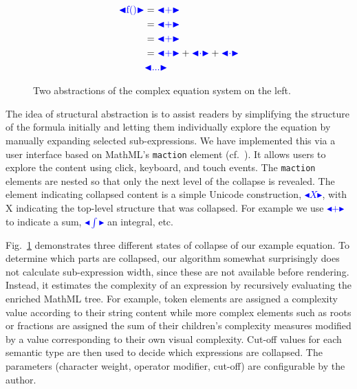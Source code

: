 \documentclass{sig-alternate}
\def\collapse#1{\textcolor{blue}{\ensuremath{\mathord{\blacktriangleleft}
\mathord{#1}
\mathord{\blacktriangleright}}}}
\begin{document}
\begin{figure}[t]
  \begin{minipage}{1.05\columnwidth}
    \centering
  \end{minipage}
  \begin{minipage}{.1\textwidth}
    \begin{align*}
      \collapse{\mathrm{f}()} & = \collapse{+} \\
                              & = \collapse{+} \\ 
                              & = \collapse{+} \\ 
                              & = \collapse{+} + \collapse{\cdot} + \collapse{\cdot} \\
                              & \collapse{...} 
    \end{align*}
  \end{minipage}
  \begin{minipage}{.25\textwidth}
    \centering
  \end{minipage}\qquad\quad
  \vspace*{-.2cm}
  \caption{Two abstractions of the complex equation system on the left.}
  \vspace*{-.3cm}
  \label{fig:collapse}
\end{figure}


The idea of structural abstraction is to assist readers by simplifying
the structure of the formula initially and letting them individually explore the
equation by manually expanding selected sub-expressions.  We have implemented
this via a user interface based on MathML's \texttt{maction} element
(cf.~\cite[3.7.1]{MathML3}). It allows users to explore the content using click,
keyboard, and touch events. The \texttt{maction} elements are nested so that only
the next level of the collapse is revealed.  The element indicating collapsed
content is a simple Unicode construction, \collapse{X}, with X indicating the
top-level structure that was collapsed. For example we use \collapse{+} to
indicate a sum, \collapse{\mathrm{\int}} an integral, etc.

Fig.~\ref{fig:collapse} demonstrates three different states of collapse of our
example equation.  To determine which parts are collapsed, our algorithm
somewhat surprisingly does not calculate sub-expression width, since these are
not available before rendering. Instead, it estimates the complexity of an
expression by recursively evaluating the enriched MathML tree. For example,
token elements are assigned a complexity value according to their string content
while more complex elements such as roots or fractions are assigned the sum of
their children's complexity measures modified by a value corresponding to their
own visual complexity. Cut-off values for each semantic type are then used to
decide which expressions are collapsed. The parameters (character weight,
operator modifier, cut-off) are configurable by the author.
\end{document}
